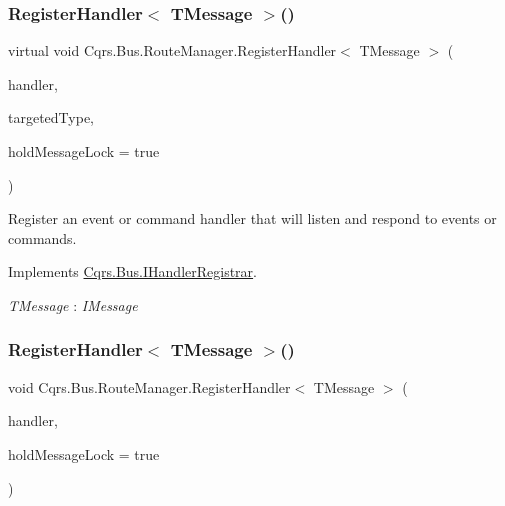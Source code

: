 \subsubsection{\texorpdfstring{Register\+Handler$<$ T\+Message $>$()}{RegisterHandler< TMessage >()}\hspace{0.1cm}{\footnotesize\ttfamily [1/2]}}
{\footnotesize\ttfamily virtual void Cqrs.\+Bus.\+Route\+Manager.\+Register\+Handler$<$ T\+Message $>$ (\begin{DoxyParamCaption}\item[{Action$<$ T\+Message $>$}]{handler,  }\item[{Type}]{targeted\+Type,  }\item[{bool}]{hold\+Message\+Lock = {\ttfamily true} }\end{DoxyParamCaption})\hspace{0.3cm}{\ttfamily [virtual]}}



Register an event or command handler that will listen and respond to events or commands. 



Implements \hyperlink{interfaceCqrs_1_1Bus_1_1IHandlerRegistrar_ab6ca4dfdc54a5aeebe4651dbdb479f55_ab6ca4dfdc54a5aeebe4651dbdb479f55}{Cqrs.\+Bus.\+I\+Handler\+Registrar}.

\begin{Desc}
\item[Type Constraints]\begin{description}
\item[{\em T\+Message} : {\em I\+Message}]\end{description}
\end{Desc}
\mbox{\label{classCqrs_1_1Bus_1_1RouteManager_aeb620222dd0351a6d3848caf93e29954_aeb620222dd0351a6d3848caf93e29954}} 
\subsubsection{\texorpdfstring{Register\+Handler$<$ T\+Message $>$()}{RegisterHandler< TMessage >()}\hspace{0.1cm}{\footnotesize\ttfamily [2/2]}}
{\footnotesize\ttfamily void Cqrs.\+Bus.\+Route\+Manager.\+Register\+Handler$<$ T\+Message $>$ (\begin{DoxyParamCaption}\item[{Action$<$ T\+Message $>$}]{handler,  }\item[{bool}]{hold\+Message\+Lock = {\ttfamily true} }\end{DoxyParamCaption})}




